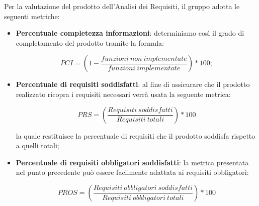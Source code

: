Per la valutazione del prodotto dell'Analisi dei Requisiti, il gruppo adotta le seguenti metriche:
\begin{itemize}
	\item \textbf{Percentuale completezza informazioni}: determiniamo così il grado di completamento del prodotto tramite la formula:
\begin{center}
\[PCI = \left(1-\frac{funzioni \ non \ implementate}{funzioni \ implementate}\right)\ast100;\]
\end{center}


	\item \textbf{Percentuale di requisiti soddisfatti}: al fine di assicurare che il prodotto realizzato ricopra i requisiti necessari verrà usata la seguente metrica:
\begin{center}
\[PRS = \left(\frac{Requisiti\ soddisfatti}{Requisiti\ totali}\right)*100\]
\end{center}
la quale restituisce la percentuale di requisiti che il prodotto soddisfa rispetto a quelli totali;

	\item \textbf{Percentuale di requisiti obbligatori soddisfatti}: la metrica presentata nel punto precedente può essere facilmente adattata ai requisiti obbligatori:
\begin{center}
\[PROS=\left(\frac{Requisiti\ obbligatori\ soddisfatti}{Requisiti\ obbligatori\ totali}\right)*100\]
\end{center}
\end{itemize}


